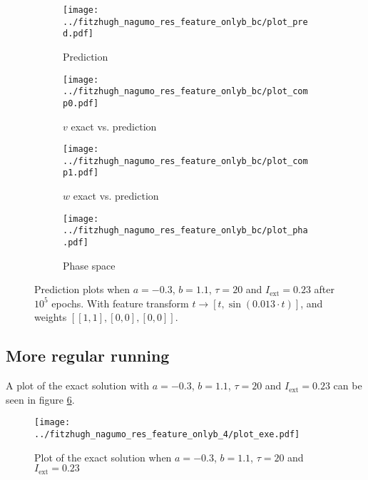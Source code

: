 \documentclass[a4paper]{article}
\begin{document}
\begin{figure}[H]
	\centering 
	\begin{subfigure}[b]{0.47\textwidth}
		\centering
		\texttt{[image: ../fitzhugh\_nagumo\_res\_feature\_onlyb\_bc/plot\_pred.pdf]}
		\caption{Prediction}
		\label{fig:justbauxa}
	\end{subfigure}
	\begin{subfigure}[b]{0.47\textwidth}
		\centering
		\texttt{[image: ../fitzhugh\_nagumo\_res\_feature\_onlyb\_bc/plot\_comp0.pdf]}
		\caption{$v$ exact vs. prediction}
		\label{fig:justbauxb}
	\end{subfigure}
	\begin{subfigure}[b]{0.47\textwidth}
		\centering
		\texttt{[image: ../fitzhugh\_nagumo\_res\_feature\_onlyb\_bc/plot\_comp1.pdf]}
		\caption{$w$ exact vs. prediction}
		\label{fig:justbauxc}
	\end{subfigure}
	\begin{subfigure}[b]{0.47\textwidth}
		\centering
		\texttt{[image: ../fitzhugh\_nagumo\_res\_feature\_onlyb\_bc/plot\_pha.pdf]}
		\caption{Phase space}
		\label{fig:justbauxd}
	\end{subfigure}
	\caption{Prediction plots when $a=-0.3$, $b=1.1$, $\tau=20$ and $ I_{\text{ext}}=0.23$ after $10^5$ epochs. With feature transform $t \rightarrow \left[ t, \sin(0.013\cdot t) \right] $, and weights $\left[ \left[ 1, 1\right], \left[ 0, 0\right], \left[ 0, 0\right] \right]$.}
	\label{plot:justbaux}
\end{figure} 	



\subsection{More regular running}


A plot of the exact solution with $a=-0.3$, $b=1.1$, $\tau=20$ and $ I_{\text{ext}}=0.23$ can be seen in figure \ref{plot:exe0}.

\begin{figure}[H]
	\centering 
	\texttt{[image: ../fitzhugh\_nagumo\_res\_feature\_onlyb\_4/plot\_exe.pdf]}
	\caption{Plot of the exact solution when $a=-0.3$, $b=1.1$, $\tau=20$ and $ I_{\text{ext}}=0.23$}
	\label{plot:exe0}
\end{figure}
\end{document}
